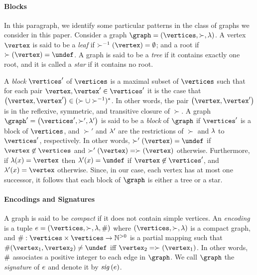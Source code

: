 \paragraph{\bf Blocks}
In this paragraph, we identify some particular patterns in the class of
graphs we consider in this paper.
%
Consider a graph $\graph=\tuple{\vertices,\succ,\labeling}$.
%
A vertex $\vertex$ is said to be a {\it leaf} if $\succ^{-1}(\vertex)=\emptyset$;
and a root if $\succ(\vertex)=\undef$.
%
A graph is said to be a {\it tree} if it contains exactly one root, and it
is called a {\it star} if it contains no root.

%
A {\it block} $\vertices'$ of $\vertices$ is a maximal subset of $\vertices$
such that for each pair $\vertex,\vertex'\in\vertices'$ it is the
case that $\tuple{\vertex,\vertex'}\in(\succ\cup\succ^{-1})^*$.
%
In other words, the pair
$\tuple{\vertex,\vertex'}$ is in the reflexive, symmetric, and transitive closure of
$\succ$.
%
A graph $\graph'=\tuple{\vertices',\succ',\labeling'}$ is said to be a {\it block}
of $\graph$ if $\vertices'$ is a block of $\vertices$, and 
$\succ'$ and $\lambda'$ are the restrictions of $\succ$ and $\lambda$ to
$\vertices'$, respectively.
%
In other words, $\succ'(\vertex)=\undef$ if $\vertex\not\in\vertices$
and $\succ'(\vertex)=\succ(\vertex)$  otherwise.
%
Furthermore, if $\labeling(\xvar)=\vertex$ then
$\labeling'(\xvar)=\undef$ if $\vertex\not\in\vertices'$, and
$\labeling'(\xvar)=\vertex$ otherwise.
%
Since, in our case, each vertex has at most one successor, it follows that 
each block of $\graph$ is either a tree or a star.
%




\paragraph{\bf Encodings and Signatures}

A graph is said to be {\it compact} if it does not contain simple vertices.
%
An {\it encoding} is a tuple $\encoding=\tuple{\vertices,\succ,\labeling,\cnt}$ where
$\tuple{\vertices,\succ,\labeling}$ is a compact graph, and
$\cnt:\vertices\times\vertices\rightarrow\pintgrs$ is a partial mapping such that
$\cnt(\vertex_1,\vertex_2)\neq\undef$ iff $\vertex_2=\succ(\vertex_1)$.
%
In other words, $\#$ associates a positive integer to each edge in $\graph$.
%
We call $\graph$ the {\it signature} of $e$ and denote it by ${\it sig}\left(e\right)$.

